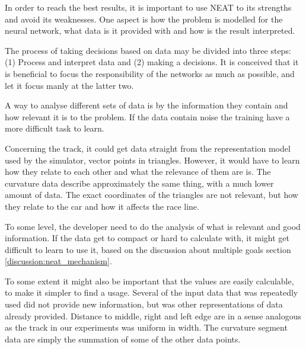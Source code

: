 
In order to reach the best results, it is important to use NEAT to its strengths and avoid its weaknesses. One aspect is how the problem is modelled for the neural network, what data is it provided with and how is the result interpreted.

The process of taking decisions based on data may be divided into three steps: (1) Process and interpret data and (2) making a decisions. It is conceived that it is beneficial to focus the responsibility of the networks as much as possible, and let it focus manly at the latter two. 


A way to analyse different sets of data is by the information they contain and how relevant it is to the problem. If the data contain noise the training have a more difficult task to learn.

Concerning the track, it could get data straight from the representation model used by the simulator, vector points in triangles. However, it would have to learn how they relate to each other and what the relevance of them are is. The curvature data describe approximately the same thing, with a much lower amount of data. The exact coordinates of the triangles are not relevant, but how they relate to the car and how it affects the race line. 

To some level, the developer need to do the analysis of what is relevant and good information. If the data get to compact or hard to calculate with, it might get difficult to learn to use it, based on the discussion about multiple goals section \ref{discussion:neat_mechanism}.

To some extent it might also be important that the values are easily calculable, to make it simpler to find a usage. Several of the input data that was repeatedly used did not provide new information, but was other representations of data already provided. Distance to middle, right and left edge are in a sense analogous as the track in our experiments was uniform in width. The curvature segment data are simply the summation of some of the other data points.

